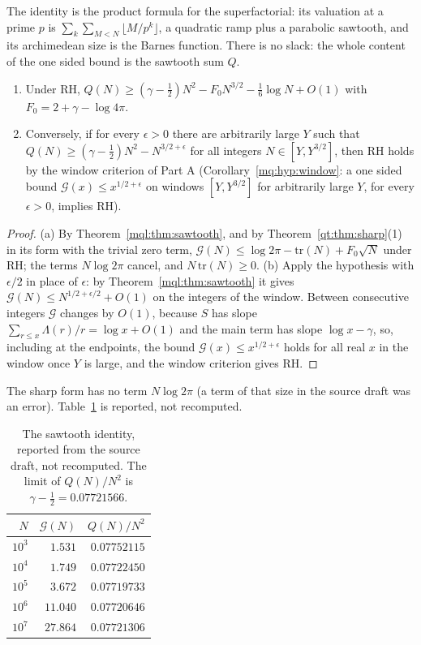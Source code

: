 The identity is the product formula for the superfactorial: its valuation at a prime $p$ is $\sum_k\sum_{M<N}\lfloor M/p^k\rfloor$, a quadratic ramp plus a parabolic sawtooth, and its archimedean size is the Barnes function. There is no slack: the whole content of the one sided bound is the sawtooth sum $Q$.

\begin{corollary}\label{mql:cor:sawtoothRH}
\begin{enumerate}
\item Under RH, $Q(N)\ge(\gamma-\frac12)N^2-F_0N^{3/2}-\frac16\log N+O(1)$ with $F_0=2+\gamma-\log4\pi$.
\item Conversely, if for every $\epsilon>0$ there are arbitrarily large $Y$ such that $Q(N)\ge(\gamma-\frac12)N^2-N^{3/2+\epsilon}$ for all integers $N\in[Y,Y^{3/2}]$, then RH holds by the window criterion of Part A (Corollary~\ref{mq:hyp:window}: a one sided bound $\mathcal G(x)\le x^{1/2+\epsilon}$ on windows $[Y,Y^{3/2}]$ for arbitrarily large $Y$, for every $\epsilon>0$, implies RH).
\end{enumerate}
\end{corollary}

\begin{proof}
(a) By Theorem~\ref{mql:thm:sawtooth}, and by Theorem~\ref{qt:thm:sharp}(1) in its form with the trivial zero term, $\mathcal G(N)\le\log2\pi-\mathrm{tr}(N)+F_0\sqrt N$ under RH; the terms $N\log2\pi$ cancel, and $N\,\mathrm{tr}(N)\ge0$. (b) Apply the hypothesis with $\epsilon/2$ in place of $\epsilon$: by Theorem~\ref{mql:thm:sawtooth} it gives $\mathcal G(N)\le N^{1/2+\epsilon/2}+O(1)$ on the integers of the window. Between consecutive integers $\mathcal G$ changes by $O(1)$, because $S$ has slope $\sum_{r\le x}\Lambda(r)/r=\log x+O(1)$ and the main term has slope $\log x-\gamma$, so, including at the endpoints, the bound $\mathcal G(x)\le x^{1/2+\epsilon}$ holds for all real $x$ in the window once $Y$ is large, and the window criterion gives RH.
\end{proof}

The sharp form has no term $N\log2\pi$ (a term of that size in the source draft was an error). Table~\ref{mql:tab:sawtooth} is reported, not recomputed.

\begin{table}[h]
\centering\small
\begin{tabular}{@{}rrr@{}}
\toprule
$N$ & $\mathcal G(N)$ & $Q(N)/N^2$\\
\midrule
$10^3$ & $1.531$ & $0.07752115$\\
$10^4$ & $1.749$ & $0.07722450$\\
$10^5$ & $3.672$ & $0.07719733$\\
$10^6$ & $11.040$ & $0.07720646$\\
$10^7$ & $27.864$ & $0.07721306$\\
\bottomrule
\end{tabular}
\caption{The sawtooth identity, reported from the source draft, not recomputed. The limit of $Q(N)/N^2$ is $\gamma-\frac12=0.07721566$.}\label{mql:tab:sawtooth}
\end{table}


